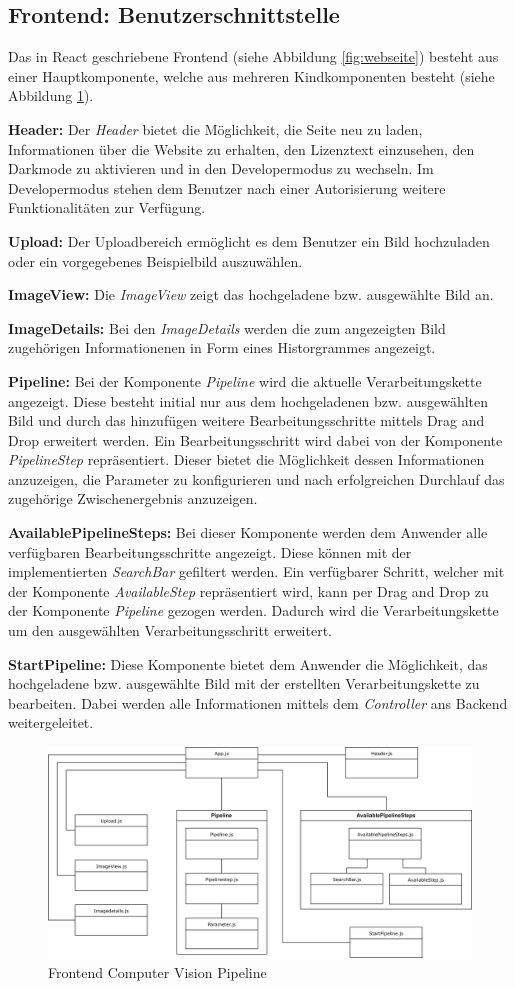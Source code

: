 \subsection{Frontend: Benutzerschnittstelle}
Das in React geschriebene Frontend (siehe Abbildung \ref{fig:webseite}) besteht aus einer Hauptkomponente, welche aus mehreren Kindkomponenten besteht (siehe Abbildung \ref{fig:frontend}).

\textbf{Header:} Der \textit{Header} bietet die Möglichkeit, die Seite neu zu laden, Informationen über die Website zu erhalten, den Lizenztext einzusehen, den Darkmode zu aktivieren und in den Developermodus zu wechseln. Im Developermodus stehen dem Benutzer nach einer Autorisierung weitere Funktionalitäten zur Verfügung.

\textbf{Upload:} Der Uploadbereich ermöglicht es dem Benutzer ein Bild hochzuladen oder ein vorgegebenes Beispielbild auszuwählen.

\textbf{ImageView:} Die \textit{ImageView} zeigt das hochgeladene bzw. ausgewählte Bild an.

\textbf{ImageDetails:} Bei den \textit{ImageDetails} werden die zum angezeigten Bild zugehörigen Informationenen in Form eines Historgrammes angezeigt.

\textbf{Pipeline:} Bei der Komponente \textit{Pipeline} wird die aktuelle Verarbeitungskette angezeigt. Diese besteht initial nur aus dem hochgeladenen bzw. ausgewählten Bild und durch das hinzufügen weitere Bearbeitungsschritte mittels Drag and Drop erweitert werden. Ein Bearbeitungsschritt wird dabei von der Komponente \textit{PipelineStep} repräsentiert. Dieser bietet die Möglichkeit dessen Informationen anzuzeigen, die Parameter zu konfigurieren und nach erfolgreichen Durchlauf das zugehörige Zwischenergebnis anzuzeigen.

\textbf{AvailablePipelineSteps:} Bei dieser Komponente werden dem Anwender alle verfügbaren Bearbeitungsschritte angezeigt. Diese können mit der implementierten \textit{SearchBar} gefiltert werden. Ein verfügbarer Schritt, welcher mit der Komponente \textit{AvailableStep} repräsentiert wird, kann per Drag and Drop zu der Komponente \textit{Pipeline} gezogen werden. Dadurch wird die Verarbeitungskette um den ausgewählten Verarbeitungsschritt erweitert.

\textbf{StartPipeline:} Diese Komponente bietet dem Anwender die Möglichkeit, das hochgeladene bzw. ausgewählte Bild mit der erstellten Verarbeitungskette zu bearbeiten. Dabei werden alle Informationen mittels dem \textit{Controller} ans Backend weitergeleitet.

\begin{figure}[ht]
    \centering
    \includegraphics[width=\textwidth]{Bilder/FrontendBDCC.drawio.png}
    \caption{Frontend Computer Vision Pipeline}
    \label{fig:frontend}
\end{figure}